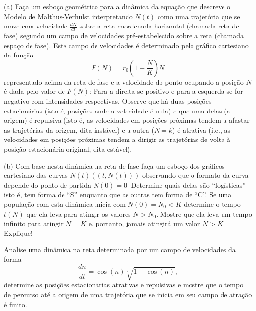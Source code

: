 \begin{exercise}
\begin{description}
\item (a) Faça um esboço geométrico para a dinâmica da equação que descreve o Modelo de Malthus-Verhulst interpretando \(N(t)\) como uma trajetória que se move com velocidade \(\frac{dN}{dt}\) sobre a reta coordenada horizontal (chamada reta de fase) segundo um campo de velocidades pré-estabelecido sobre a reta (chamada espaço de fase). Este campo de velocidades é determinado pelo gráfico cartesiano da função \[F(N) = r_0\left(1-\dfrac{N}{K}\right)N\]
representado acima da reta de fase e a velocidade do ponto ocupando a posição \(N\) é dada pelo valor de \(F(N)\): Para a direita se positivo e para a esquerda se for negativo com intensidades respectivas. Observe que há duas posições estacionárias (isto é, posições onde a velocidade é nula) e que uma delas (a origem) é repulsiva (isto é, as velocidades em posições próximas tendem a afastar as trajetórias da origem, dita instável) e a outra (\(N = k\)) é atrativa (i.e., as velocidades em posições próximas tendem a dirigir as trajetórias de volta à posição estacionária original, dita estável).
\item (b) Com base nesta dinâmica na reta de fase faça um esboço dos gráficos cartesiano das curvas \(N(t) ( (t, N(t)) )\) observando que o formato da curva depende do ponto de partida \(N(0) = 0\). Determine quais delas são ``logísticas'' isto é, tem forma de ``S'' enquanto que as outras tem forma de ``C''. Se uma população com esta dinâmica inicia com \(N(0) = N_0 < K\) determine o tempo \(t(N)\) que ela leva para atingir os valores \(N > N_0\). Mostre que ela leva um tempo infinito para atingir \(N = K\) e, portanto, jamais atingirá um valor \(N > K\). Explique!
\item Analise uma dinâmica na reta determinada por um campo de velocidades da forma \[\dfrac{dn}{dt} = \cos(n) \sqrt[4]{1-\cos(n)},\]
determine as posições estacionárias atrativas e repulsivas e mostre que o tempo de percurso até a origem de uma trajetória que se inicia em seu campo de atração é finito.
\end{description}
\end{exercise}

